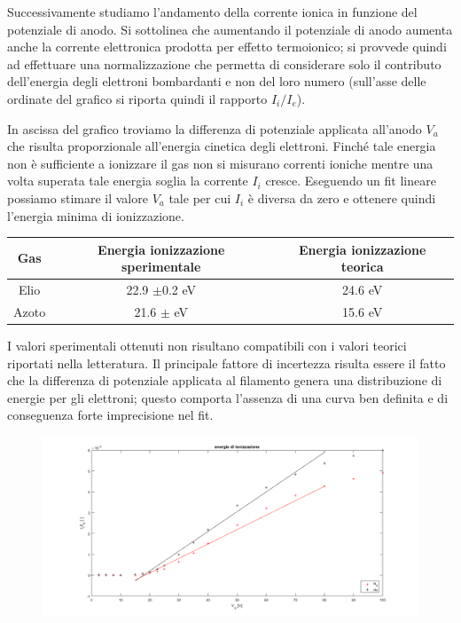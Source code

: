 \documentclass[11pt,a4paper]{article}
\begin{document}
Successivamente studiamo l'andamento della corrente ionica in funzione del potenziale di anodo. Si sottolinea che aumentando il potenziale di anodo aumenta anche la corrente elettronica prodotta per effetto termoionico; si provvede quindi ad effettuare una normalizzazione che permetta di considerare solo il contributo dell'energia degli elettroni bombardanti e non del loro numero (sull'asse delle ordinate del grafico si riporta quindi il rapporto $I_{i}/I_{e}$).

In ascissa del grafico troviamo la differenza di potenziale applicata all'anodo $V_{a}$ che risulta proporzionale all'energia cinetica degli elettroni. Finché tale energia non è sufficiente a ionizzare il gas non si misurano correnti ioniche mentre una volta superata tale energia soglia la corrente $I_{i}$ cresce. Eseguendo un fit lineare possiamo stimare il valore $V_{a}$ tale per cui $I_{i}$ è diversa da zero e ottenere quindi l'energia minima di ionizzazione.

\begin{tabular}{|c|c|c|}
\hline 
Gas & Energia ionizzazione sperimentale & Energia ionizzazione teorica \\ 
\hline 
Elio & 22.9 $ \pm $0.2 eV & 24.6 eV \\ 
\hline
Azoto & 21.6 $\pm$  eV & 15.6 eV \\ 
\hline 
\end{tabular} 

I valori sperimentali ottenuti non risultano compatibili con i valori teorici riportati nella letteratura. Il principale fattore di incertezza risulta essere il fatto che la differenza di potenziale applicata al filamento genera una distribuzione di energie per gli elettroni; questo comporta l'assenza di una curva ben definita e di conseguenza forte imprecisione nel fit. 

\begin{figure}[h]
\includegraphics[width=\textwidth]{fig1}
\end{figure}
\end{document}
